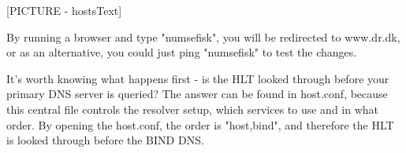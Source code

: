 [PICTURE - hostsText]

By running a browser and type "numsefisk", you will be redirected to www.dr.dk, or as an alternative, you could just ping "numsefisk" to test the changes.

It's worth knowing what happens first - is the HLT looked through before your primary DNS server is queried? 
The answer can be found in host.conf, because this central file controls the resolver setup, which services to use and in what order. By opening the host.conf, the order is "host,bind", and therefore the HLT is looked through before the BIND DNS.